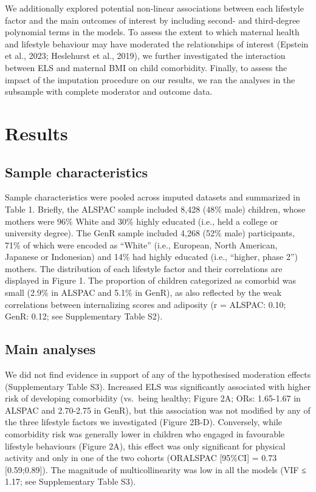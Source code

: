 \documentclass[
  letterpaper,
  DIV=11,
  numbers=noendperiod]{scrreport}
\begin{document}
We additionally explored potential non-linear associations between each
lifestyle factor and the main outcomes of interest by including second-
and third-degree polynomial terms in the models. To assess the extent to
which maternal health and lifestyle behaviour may have moderated the
relationships of interest (Epstein et al., 2023; Heslehurst et al.,
2019), we further investigated the interaction between ELS and maternal
BMI on child comorbidity. Finally, to assess the impact of the
imputation procedure on our results, we ran the analyses in the
subsample with complete moderator and outcome data.

\section{Results}\label{results-1}

\subsection{Sample characteristics}\label{sample-characteristics}

Sample characteristics were pooled across imputed datasets and
summarized in Table 1. Briefly, the ALSPAC sample included 8,428 (48\%
male) children, whose mothers were 96\% White and 30\% highly educated
(i.e., held a college or university degree). The GenR sample included
4,268 (52\% male) participants, 71\% of which were encoded as ``White''
(i.e., European, North American, Japanese or Indonesian) and 14\% had
highly educated (i.e., ``higher, phase 2'') mothers. The distribution of
each lifestyle factor and their correlations are displayed in Figure 1.
The proportion of children categorized as comorbid was small (2.9\% in
ALSPAC and 5.1\% in GenR), as also reflected by the weak correlations
between internalizing scores and adiposity (r = ALSPAC: 0.10; GenR:
0.12; see Supplementary Table S2).

\subsection{Main analyses}\label{main-analyses-1}

We did not find evidence in support of any of the hypothesised
moderation effects (Supplementary Table S3). Increased ELS was
significantly associated with higher risk of developing comorbidity
(vs.~being healthy; Figure 2A; ORs: 1.65-1.67 in ALSPAC and 2.70-2.75 in
GenR), but this association was not modified by any of the three
lifestyle factors we investigated (Figure 2B-D). Conversely, while
comorbidity risk was generally lower in children who engaged in
favourable lifestyle behaviours (Figure 2A), this effect was only
significant for physical activity and only in one of the two cohorts
(ORALSPAC {[}95\%CI{]} = 0.73 {[}0.59;0.89{]}). The magnitude of
multicollinearity was low in all the models (VIF ≤ 1.17; see
Supplementary Table S3).
\end{document}
